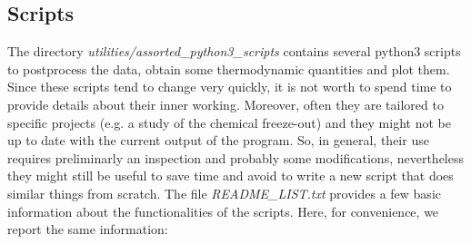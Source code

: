 \documentclass[12pt, a4paper]{article}
\begin{document}
\subsection{Scripts}\label{postproc}
The directory \emph{utilities/assorted\_python3\_scripts} contains several python3 scripts to postprocess the data, obtain some thermodynamic quantities and plot them. Since these scripts tend to change very quickly, it is not worth to spend time to provide details about their inner working. Moreover, often they are tailored to specific projects (e.g. a study of the chemical freeze-out) and they might not be up to date with the current output of the program. So, in general, their use requires preliminarly an inspection and probably some modifications, nevertheless they might still be useful to save time and avoid to write a new script that does similar things from scratch. The file \emph{README\_LIST.txt} provides a few basic information about the functionalities of the scripts. Here, for convenience, we report the same information:
\end{document}
